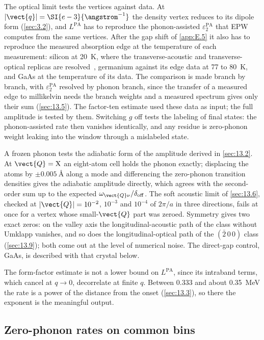 The optical limit tests the vertices against data. At $|\vect{q}| = \SI{e-3}{\angstrom^{-1}}$ the density vertex reduces to its dipole form (\cref{sec:3.2}), and $L^{\mathrm{PA}}$ has to reproduce the phonon-assisted $\varepsilon_2^{\mathrm{PA}}$ that EPW computes from the same vertices. After the gap shift of \cref{app:E.5} it also has to reproduce the measured absorption edge at the temperature of each measurement: silicon at \SI{20}{K}, where the transverse-acoustic and transverse-optical replicas are resolved~\cite{macfarlane1958fine}, germanium against its edge data at 77 to \SI{80}{K}, and GaAs at the temperature of its data. The comparison is made branch by branch, with $\varepsilon_2^{\mathrm{PA}}$ resolved by phonon branch, since the transfer of a measured edge to millikelvin needs the branch weights and a measured spectrum gives only their sum (\cref{sec:13.5}). The factor-ten estimate used these data as input; the full amplitude is tested by them. Switching $g$ off tests the labeling of final states: the phonon-assisted rate then vanishes identically, and any residue is zero-phonon weight leaking into the window through a mislabeled state.

A frozen phonon tests the adiabatic form of the amplitude derived in \cref{sec:13.2}. At $\vect{Q} = \mathrm{X}$ an eight-atom cell holds the phonon exactly; displacing the atoms by $\pm\SI{0.005}{\angstrom}$ along a mode and differencing the zero-phonon transition densities gives the adiabatic amplitude directly, which agrees with the second-order sum up to the expected $\omega_{\vect{Q}\nu}/\delta_{\mathrm{off}}$. The soft acoustic limit of \cref{sec:13.6}, checked at $|\vect{Q}| = 10^{-2}$, $10^{-3}$ and $10^{-4}$ of $2\pi/a$ in three directions, fails at once for a vertex whose small-$\vect{Q}$ part was zeroed. Symmetry gives two exact zeros: on the valley axis the longitudinal-acoustic path of the class without Umklapp vanishes, and so does the longitudinal-optical path of the $(\bar2\,0\,0)$ class (\cref{sec:13.9}); both come out at the level of numerical noise. The direct-gap control, GaAs, is described with that crystal below.

The form-factor estimate is not a lower bound on $L^{\mathrm{PA}}$, since its intraband terms, which cancel at $q \to 0$, decorrelate at finite $q$. Between 0.333 and about \SI{0.35}{MeV} the rate is a power of the distance from the onset (\cref{sec:13.3}), so there the exponent is the meaningful output.

\subsection{Zero-phonon rates on common bins}

